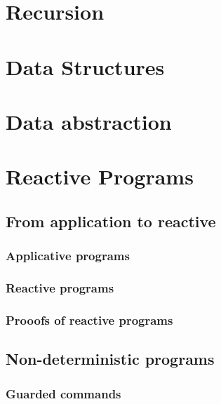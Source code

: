 \documentclass[12pt, a4paper]{book}
\begin{document}
  \section{Recursion}
  \label{sec:Recursion}

  \section{Data Structures}
  \label{sec:Data Structures}

  \section{Data abstraction}
  \label{sec:Data abstraction}


  \section{Reactive Programs}
  \label{sec:Reactive Programs}
  \subsection{From application to reactive}
  \label{sub:From application to reactive}
  \subsubsection{Applicative programs}
  \label{subs:Applicative programs}
  \subsubsection{Reactive programs}
  \label{subs:Reactive programs}
  \subsubsection{Prooofs of reactive programs}
  \label{subs:Prooofs of reactive programs}
  \subsection{Non-deterministic programs}
  \label{sub:Non-deterministic programs}
  \subsubsection{Guarded commands}
  \label{subs:Guarded commands}
\end{document}
